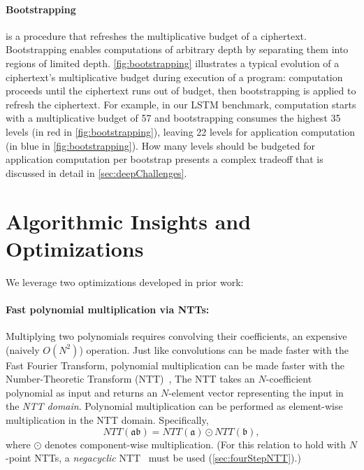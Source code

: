 \figBootstrapping

\paragraph{Bootstrapping} is a procedure that refreshes the multiplicative
budget of a ciphertext. Bootstrapping enables computations of arbitrary depth
by separating them into regions of limited depth. \autoref{fig:bootstrapping}
illustrates a typical evolution of a ciphertext's multiplicative budget during
execution of a program: computation proceeds until the ciphertext runs out of
budget, then bootstrapping is applied to refresh the ciphertext. For example,
in our LSTM benchmark, computation starts with a multiplicative budget of 57
and bootstrapping consumes the highest 35 levels (in red in
\autoref{fig:bootstrapping}), leaving 22 levels for application computation (in
blue in \autoref{fig:bootstrapping}). How many levels should be budgeted for
application computation per bootstrap presents a complex tradeoff that is
discussed in detail in \autoref{sec:deepChallenges}.

\section{Algorithmic Insights and Optimizations}\label{sec:algoInsights}
\label{sec:fhe_optimizations}

We leverage two optimizations developed in prior work:

\paragraph{Fast polynomial multiplication via NTTs:} Multiplying two
polynomials requires convolving their coefficients, an expensive (naively
$O(N^2)$) operation. Just like convolutions can be made faster with the Fast
Fourier Transform, polynomial multiplication can be made faster with the
Number-Theoretic Transform (NTT)~\cite{moenck1976practical}, The NTT takes an
$N$\hyp{}coefficient polynomial as input and returns an $N$\hyp{}element vector
representing the input in the \textit{NTT domain}. Polynomial multiplication
can be performed as element-wise multiplication in the NTT domain.
Specifically,
\begin{equation*}
    NTT(\mathfrak{a}\mathfrak{b}) = NTT(\mathfrak{a}) \odot NTT(\mathfrak{b}),
\end{equation*}
where $\odot$ denotes component-wise multiplication. (For this relation to hold
with $N$\hyp{}point NTTs, a \emph{negacyclic}
NTT~\cite{lyubashevsky:tact10:ideal} must be used (\autoref{sec:fourStepNTT}).)

